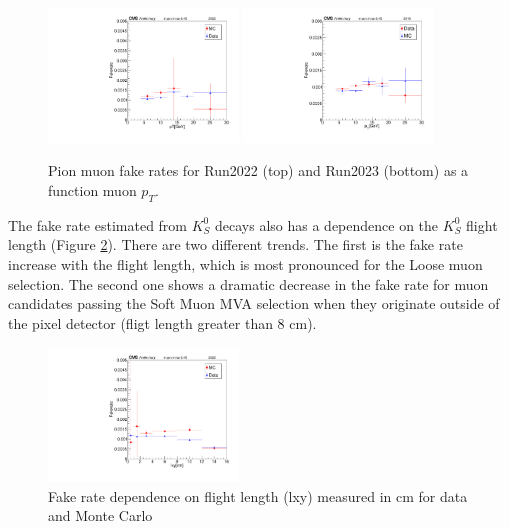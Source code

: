 \begin{figure}[!p]
  \begin{center}
    \includegraphics[width=0.45\textwidth]{figures/chapter4/fakerate/Run2022_pion-fakes.pdf}
    \includegraphics[width=0.45\textwidth]{figures/chapter4/fakerate/Run2023_pion-fakes.pdf}
    \caption{Pion muon fake rates for Run2022 (top) and
      Run2023 (bottom) as a function muon $p_{T}$.}
    \label{fig:fakerates}
  \end{center}
\end{figure}


The fake rate estimated from $K_S^0$ decays also has a dependence on the $K_S^0$ flight length (Figure \ref{fig:pion_fake_rate_fs_flight_length}). There are two different trends. The first is the fake rate increase with the flight length, which is most pronounced for the Loose muon selection. The second one shows a dramatic decrease in the fake rate for muon candidates passing the Soft Muon MVA selection when they originate outside of the pixel detector (fligt length greater than 8 cm).

\begin{figure}[!htb]
  \begin{center}
    \includegraphics[width=0.45\textwidth]{figures/chapter4/fakerate/playV0-ks_kin_lxy_muidbdt45_MC_v_Data_overlay.pdf}
  \end{center}
  \caption{Fake rate dependence on flight length (lxy) measured in cm for data and Monte Carlo}
  \label{fig:pion_fake_rate_fs_flight_length}
\end{figure}

